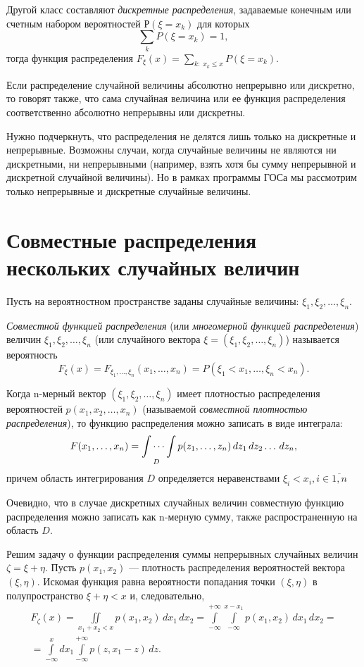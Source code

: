Другой класс составляют \textit{дискретные распределения}, задаваемые конечным или счетным набором вероятностей $Р(\xi=x_k)$ для которых
$$
\sum\limits_k P(\xi=x_k)=1,
$$
тогда функция распределения $F_\xi(x)=\sum\limits_{k:\; x_k \le x} P(\xi=x_k)$.

Если распределение случайной величины абсолютно непрерывно или дискретно, то говорят также, что сама случайная величина или ее функция распределения соответственно абсолютно непрерывны или дискретны.

Нужно подчеркнуть, что распределения не делятся лишь только на дискретные и непрерывные. Возможны случаи, когда случайные величины не являются ни дискретными, ни непрерывными (например, взять хотя бы сумму непрерывной и дискретной случайной величины). Но в рамках программы ГОСа мы рассмотрим только непрерывные и дискретные случайные величины. 

\section{Совместные распределения нескольких случайных величин}
Пусть на вероятностном пространстве заданы случайные величины: $\xi_1,\xi_2,\dots,\xi_n$.
\begin{defn}
\textit{Совместной функцией распределения} (или\textit{ многомерной функцией распределения}) величин $\xi_1,\xi_2,\dots,\xi_n$ (или случайного вектора $\xi = (\xi_1,\xi_2,\dots,\xi_n)$) называется вероятность 
$$
F_\xi(x)=F_{\xi_1,\dots,\xi_n}(x_1,\dots,x_n)=P(\xi_1 < x_1,\dots,\xi_n<x_n).
$$
\end{defn}

Когда n-мерный вектор $(\xi_1,\xi_2,\dots,\xi_n)$ имеет плотностью распределения вероятностей $p(x_1,x_2,\dots,x_n)$ (называемой \textit{совместной плотностью распределения}), то функцию распределения можно записать в виде интеграла:
$$
F(x_1,\dots,x_n)=\idotsint\limits_D p(z_1,\dots,z_n)\,dz_1\,dz_2\dots\,dz_n,
$$
причем область интегрирования $D$ определяется неравенствами $\xi_i<x_i, i\in \overline{1,n}$

Очевидно, что в случае дискретных случайных величин совместную функцию распределения можно записать как n-мерную сумму, также распространенную на область $D$.


Решим задачу о функции распределения суммы непрерывных случайных величин $\zeta=\xi+\eta$. Пусть $p(x_1,x_2)$ --- плотность распределения вероятностей вектора $(\xi,\eta)$. Искомая функция равна вероятности попадания точки $(\xi,\eta)$ в полупространство $\xi+\eta<x$ и, следовательно, 
\begin{multline}\label{ch31.1eq1}
F_{\zeta}(x)=\iint\limits_{x_1+x_2<x} p(x_1,x_2)\,dx_1\,dx_2=\int\limits_{-\infty}^{+\infty}\int\limits_{-\infty}^{x-x_1}p(x_1,x_2)\,dx_1\,dx_2=\\
=\int\limits_{-\infty}^{x}dx_1\int\limits_{-\infty}^{+\infty} p(z,x_1-z)\,dz.
\end{multline}

